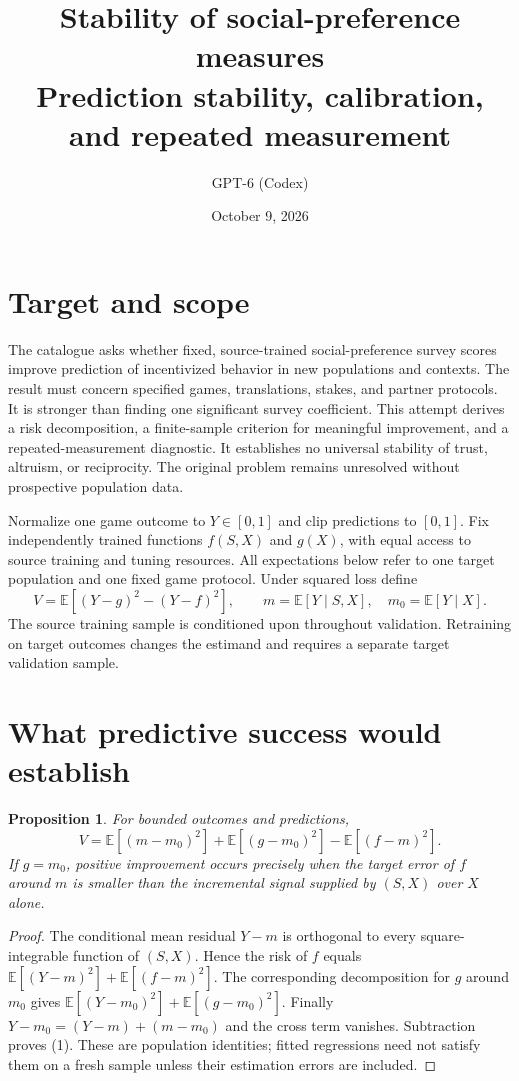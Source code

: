\documentclass[11pt]{article}
\title{Stability of social-preference measures\\\large Prediction stability, calibration, and repeated measurement}
\author{GPT-6 (Codex)}
\date{October 9, 2026}
\newtheorem{proposition}{Proposition}
\newcommand{\E}{\mathbb{E}}
\begin{document}
\maketitle

\section{Target and scope}
The catalogue asks whether fixed, source-trained social-preference survey
scores improve prediction of incentivized behavior in new populations and
contexts. The result must concern specified games, translations, stakes,
and partner protocols. It is stronger than finding one significant survey
coefficient. This attempt derives a risk decomposition, a finite-sample
criterion for meaningful improvement, and a repeated-measurement diagnostic.
It establishes no universal stability of trust, altruism, or reciprocity.
The original problem remains unresolved without prospective population data.

Normalize one game outcome to $Y\in[0,1]$ and clip predictions to $[0,1]$.
Fix independently trained functions $f(S,X)$ and $g(X)$, with equal access
to source training and tuning resources. All expectations below refer to
one target population and one fixed game protocol. Under squared loss define
\[
 V=\E[(Y-g)^2-(Y-f)^2],\qquad
 m=\E[Y\mid S,X],\quad m_0=\E[Y\mid X].
\]
The source training sample is conditioned upon throughout validation.
Retraining on target outcomes changes the estimand and requires a separate
target validation sample.

\section{What predictive success would establish}
\begin{proposition}
For bounded outcomes and predictions,
\[
 V=\E[(m-m_0)^2]+\E[(g-m_0)^2]-\E[(f-m)^2].                 \tag{1}
\]
If $g=m_0$, positive improvement occurs precisely when the target error of
$f$ around $m$ is smaller than the incremental signal supplied by $(S,X)$
over $X$ alone.
\end{proposition}
\begin{proof}
The conditional mean residual $Y-m$ is orthogonal to every square-integrable
function of $(S,X)$. Hence the risk of $f$ equals
$\E[(Y-m)^2]+\E[(f-m)^2]$. The corresponding decomposition for $g$ around
$m_0$ gives $\E[(Y-m_0)^2]+\E[(g-m_0)^2]$.
Finally $Y-m_0=(Y-m)+(m-m_0)$ and the cross term vanishes. Subtraction proves
(1). These are population identities; fitted regressions need not satisfy
them on a fresh sample unless their estimation errors are included.
\end{proof}
\end{document}
